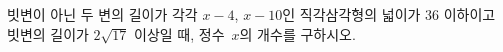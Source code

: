 빗변이 아닌 두 변의 길이가 각각 $x-4$, $x-10$인 직각삼각형의 넓이가 $36$ 이하이고 빗변의 길이가 $2\sqrt{17}$ 이상일 때, 정수~$x$의 개수를 구하시오.
